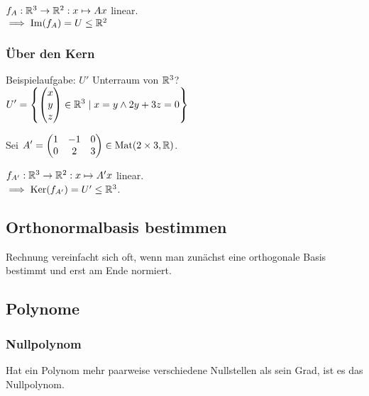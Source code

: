 $f_A: \mathbb{R}^3 \to \mathbb{R}^2: x \mapsto Ax$ linear. \\
$\implies \operatorname{Im}(f_A)=U \le \mathbb{R}^2$

\subsubsection*{Über den Kern}
Beispielaufgabe: $U'$ Unterraum von $\mathbb{R}^3$? \\
$\displaystyle U'=\left\{\begin{pmatrix} x\\y\\z \end{pmatrix}\in\mathbb{R}^3 \mid x=y \land 2y+3z=0\right\}$

Sei $\displaystyle A'=\begin{pmatrix} 1 & -1 & 0 \\ 0 & 2 & 3 \end{pmatrix} \in\operatorname{Mat}(2\times3, \mathbb{R})$.

$f_{A'}: \mathbb{R}^3 \to \mathbb{R}^2: x\mapsto A'x$ linear. \\
$\implies \operatorname{Ker}(f_{A'})=U' \le \mathbb{R}^3$.

\subsection*{Orthonormalbasis bestimmen}
Rechnung vereinfacht sich oft,
wenn man zunächst eine orthogonale Basis bestimmt
und erst am Ende normiert.

\subsection*{Polynome}
\subsubsection*{Nullpolynom}
Hat ein Polynom mehr paarweise verschiedene Nullstellen als sein Grad,
ist es das Nullpolynom.
